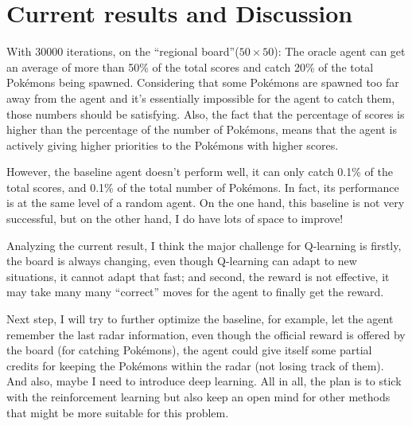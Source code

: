 \documentclass[12pt]{article}
\begin{document}
\section*{Current results and Discussion}
With 30000 iterations, on the ``regional board''($50 \times 50$):
The oracle agent can get an average of more than 50\% of the total scores and catch 20\% of the total Pok\'emons being 
spawned. Considering that 
some Pok\'emons are spawned too far away from 
the agent and it's essentially impossible for the agent to catch them, those
numbers should be satisfying. Also, the fact that the percentage of scores 
is higher than the percentage of the number of Pok\'emons, means that the 
agent is actively giving higher priorities to the Pok\'emons with higher scores.
\par
However, the baseline agent doesn't perform well, it can only catch 
0.1\% of the total scores, and 0.1\% of the total number of Pok\'emons.
In fact, its performance is at the same level of 
a random agent. On the one hand, this baseline is not very successful,
but on the other hand, I do have lots of space to improve! 
\par
Analyzing the current result, I think the major challenge for Q-learning is
firstly, the board is always changing, 
even though Q-learning can adapt to new situations, it cannot adapt that fast; 
and second, the reward is not effective, it may take many many ``correct'' moves for the 
agent to finally get the reward. 
\par
Next step, I will try to further optimize the
baseline, for example, let the agent remember the last radar information, even though the 
official reward is offered by the board (for catching Pok\'emons), the agent
could give itself some partial credits for keeping the Pok\'emons within the radar (not losing track of them). And also, maybe I need to introduce deep 
learning. All in all, 
the plan is to stick with the reinforcement learning but also keep an open mind
for other methods that might be more
suitable for this problem. 
\end{document}
